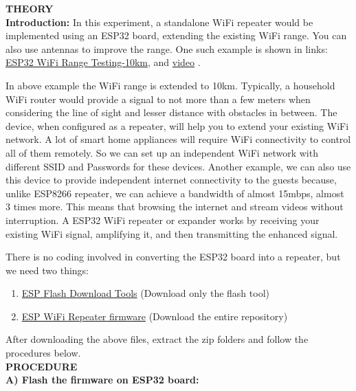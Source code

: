\documentclass[12pt,a4paper]{article}
\begin{document}
\begin{justify}
\textbf{\large THEORY}\\[3pt]
\textbf{Introduction:} In this experiment, a standalone WiFi repeater would be implemented using an ESP32 board, extending the existing WiFi range. You can also use antennas to improve the range. One such example is shown in links: \href{https://www.espressif.com/en/news/esp32%E2%80%99s-wi-fi-range-extended-10-km-directional-antenna}{ESP32 WiFi Range Testing-10km}, and \href{https://www.youtube.com/watch?v=yCLb2eItDyE} {video} .

\noindent In above example the WiFi range is extended to 10km. Typically, a household WiFi router would provide a signal to not more than a few meters when considering the line of sight and lesser distance with obstacles in between. The device, when configured as a repeater, will help you to extend your existing WiFi network. A lot of smart home appliances will require WiFi connectivity to control all of them remotely. So we can set up an independent WiFi network with different SSID and Passwords for these devices. Another example, we can also use this device to provide independent internet connectivity to the guests because, unlike ESP8266 repeater, we can achieve a bandwidth of almost 15mbps, almost 3 times more. This means that browsing the internet and stream videos without interruption. A ESP32 WiFi repeater or expander works by receiving your existing WiFi signal, amplifying it, and then transmitting the enhanced signal.\par
\noindent There is no coding involved in converting the ESP32 board into a repeater, but we need two things:
\begin{enumerate}
 \setlength\itemsep{-0.3em}
\item \href{https://www.espressif.com/en/support/download/other-tools} {ESP Flash Download Tools}  (Download only the flash tool)\\
\item  \href{https://github.com/martin-ger/esp32_nat_router}{ESP WiFi Repeater firmware} (Download the entire repository)
\end{enumerate}
After downloading the above files, extract the zip folders and follow the procedures below.\\[14pt]
\noindent \textbf{\large PROCEDURE}\\[6pt]
\textbf{A)	Flash the firmware on ESP32 board:}
\vspace{-6mm}
\begin{enumerate}
\setlength\itemsep{-0.3em}

\end{enumerate}
\end{justify}
\end{document}
